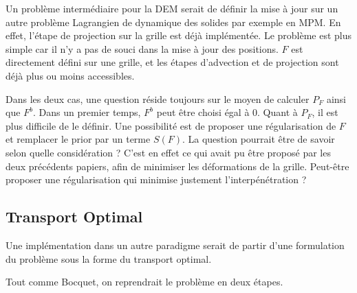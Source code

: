 \documentclass{article}
\begin{document}
Un problème intermédiaire pour la DEM serait de définir la mise à jour sur un autre problème Lagrangien de dynamique des solides par exemple en MPM. En effet, l'étape de projection sur la grille est déjà implémentée. Le problème est plus simple car il n'y a pas de souci dans la mise à jour des positions. $F$ est directement défini sur une grille, et les étapes d'advection et de projection sont déjà plus ou moins accessibles.

Dans les deux cas, une question réside toujours sur le moyen de calculer $P_{F}$ ainsi que $F^b$. Dans un premier temps, $F^b$ peut être choisi égal à 0. Quant à $P_{F}$, il est plus difficile de le définir. Une possibilité est de proposer une régularisation de $F$ et remplacer le prior par un terme $S(F)$. La question pourrait être de savoir selon quelle considération ? C'est en effet ce qui avait pu être proposé par les deux précédents papiers, afin de minimiser les déformations de la grille. Peut-être proposer une régularisation qui minimise justement l'interpénétration ?

\subsection{Transport Optimal}
Une implémentation dans un autre paradigme serait de partir d'une formulation du problème sous la forme du transport optimal.

Tout comme Bocquet, on reprendrait le problème en deux étapes.
\end{document}
